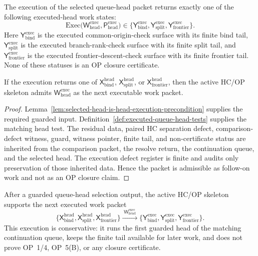 \begin{definition}
\label{def:r24-selected-queue-head-execution-output}
The execution of the selected queue-head packet returns exactly one of the following executed-head work states:
\[
\mathrm{Exec}\bigl(\mathsf W_{\mathrm{head}}^{\mathrm{exec}},
 \mathsf P_{\mathrm{head}}^{\mathrm{exec}}\bigr)
\in
\{\mathsf Y_{\mathrm{bind}}^{\mathrm{exec}},
 \mathsf Y_{\mathrm{split}}^{\mathrm{exec}},
 \mathsf Y_{\mathrm{frontier}}^{\mathrm{exec}}\}.
\]
Here \(\mathsf Y_{\mathrm{bind}}^{\mathrm{exec}}\) is the executed common-origin-check surface with its finite bind tail, \(\mathsf Y_{\mathrm{split}}^{\mathrm{exec}}\) is the executed branch-rank-check surface with its finite split tail, and \(\mathsf Y_{\mathrm{frontier}}^{\mathrm{exec}}\) is the executed frontier-descent-check surface with its finite frontier tail. None of these statuses is an OP closure certificate.
\end{definition}

\begin{proposition}
\label{prop:selected-queue-head-execution-admissible-after-r23-head-selection}
If the execution returns one of \(\mathsf X_{\mathrm{bind}}^{\mathrm{head}}\), \(\mathsf X_{\mathrm{split}}^{\mathrm{head}}\), or \(\mathsf X_{\mathrm{frontier}}^{\mathrm{head}}\), then the active HC/OP skeleton admits \(\mathsf W_{\mathrm{head}}^{\mathrm{exec}}\) as the next executable work packet.
\end{proposition}

\begin{proof}
Lemma~\ref{lem:selected-head-is-head-execution-precondition} supplies the required guarded input. Definition~\ref{def:executed-queue-head-tests} supplies the matching head test. The residual data, paired HC separation defect, comparison-defect witness, guard, witness pointer, finite tail, and non-certificate status are inherited from the comparison packet, the resolve return, the continuation queue, and the selected head. The execution defect register is finite and audits only preservation of those inherited data. Hence the packet is admissible as follow-on work and not as an OP closure claim.
\end{proof}

\begin{theorem}
\label{thm:first-selected-queue-head-execution-packet}
After a guarded queue-head selection output, the active HC/OP skeleton supports the next executed work packet
\[
 \{\mathsf X_{\mathrm{bind}}^{\mathrm{head}},
 \mathsf X_{\mathrm{split}}^{\mathrm{head}},
 \mathsf X_{\mathrm{frontier}}^{\mathrm{head}}\}
 \xrightarrow{\;\mathsf W_{\mathrm{head}}^{\mathrm{exec}}\;}
 \{\mathsf Y_{\mathrm{bind}}^{\mathrm{exec}},
 \mathsf Y_{\mathrm{split}}^{\mathrm{exec}},
 \mathsf Y_{\mathrm{frontier}}^{\mathrm{exec}}\}.
\]
This execution is conservative: it runs the first guarded head of the matching continuation queue, keeps the finite tail available for later work, and does not prove OP~1/4, OP~5(B), or any closure certificate.
\end{theorem}

